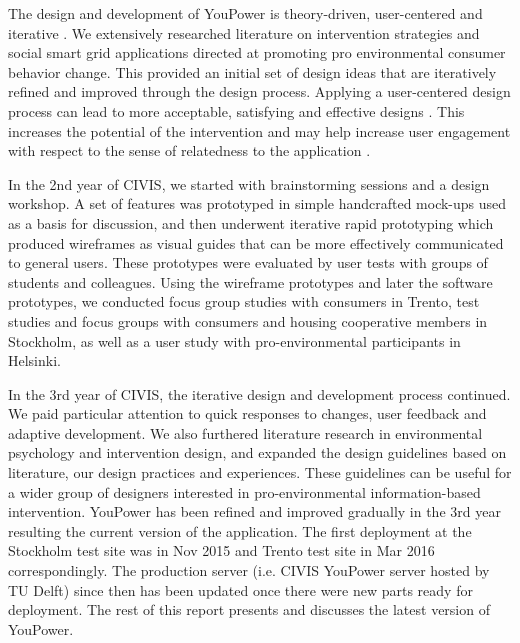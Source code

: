 The design and development of YouPower is theory-driven, user-centered and iterative \citep{Leffingwell2000,Leffingwell2011}. We extensively researched literature on intervention strategies and social smart grid applications directed at promoting pro environmental consumer behavior change. This provided an initial set of design ideas that are iteratively refined and improved through the design process. Applying a user-centered design process can lead to more acceptable, satisfying and effective designs \citep{Brynjarsdottir2012}. This increases the potential of the intervention \citep{dick2012empowering} and may help increase user engagement with respect to the sense of relatedness to the application \citep{pierce2003state,schwartz2014people,edward2015review}. 

In the 2nd year of CIVIS, we started with brainstorming sessions and a design workshop. A set of features was prototyped in simple handcrafted mock-ups used as a basis for discussion, and then underwent iterative rapid prototyping which produced wireframes as visual guides that can be more effectively communicated to general users. These prototypes were evaluated by user tests with groups of students and colleagues. Using the wireframe prototypes and later the software prototypes, we conducted focus group studies with consumers in Trento, test studies and focus groups with consumers and housing cooperative members in Stockholm, as well as a user study with pro-environmental participants in Helsinki. 

In the 3rd year of CIVIS, the iterative design and development process continued. We paid particular attention to quick responses to changes, user feedback and adaptive development. We also furthered literature research in environmental psychology and intervention design, and expanded the design guidelines based on literature, our design practices and experiences. These guidelines can be useful for a wider group of designers interested in pro-environmental information-based intervention. YouPower has been refined and improved gradually in the 3rd year resulting the current version of the application. The first deployment at the Stockholm test site was in Nov 2015 and Trento test site in Mar 2016 correspondingly. The production server (i.e. CIVIS YouPower server hosted by TU Delft) since then has been updated once there were new parts ready for deployment.  
The rest of this report presents and discusses the latest version of YouPower. 

 
 

